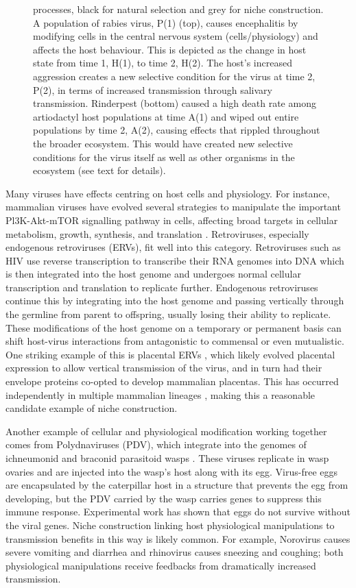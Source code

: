 \documentclass[review,draft,12pt]{elsarticle}
\begin{document}
\begin{figure}[htbp]
{processes, black for natural selection and grey for niche construction.
A population of rabies virus, P(1) (top), causes encephalitis by
modifying cells in the central nervous system (cells/physiology) and
affects the host behaviour. This is depicted as the change in host state
from time 1, H(1), to time 2, H(2). The host's increased aggression
creates a new selective condition for the virus at time 2, P(2), in
terms of increased transmission through salivary transmission.
Rinderpest (bottom) caused a high death rate among artiodactyl host
populations at time A(1) and wiped out entire populations by time 2,
A(2), causing effects that rippled throughout the broader ecosystem.
This would have created new selective conditions for the virus itself as
well as other organisms in the ecosystem (see text for details).}
\end{figure}

Many viruses have effects centring on host cells and physiology. For
instance, mammalian viruses have evolved several strategies to
manipulate the important Pl3K-Akt-mTOR signalling pathway in cells,
affecting broad targets in cellular metabolism, growth, synthesis, and
translation \citep{Buchkovich2008}. Retroviruses, especially endogenous
retroviruses (ERVs), fit well into this category. Retroviruses such as
HIV use reverse transcription to transcribe their RNA genomes into DNA
which is then integrated into the host genome and undergoes normal
cellular transcription and translation to replicate further. Endogenous
retroviruses continue this by integrating into the host genome and
passing vertically through the germline from parent to offspring,
usually losing their ability to replicate. These modifications of the
host genome on a temporary or permanent basis can shift host-virus
interactions from antagonistic to commensal or even mutualistic. One
striking example of this is placental ERVs \citep{Haig:2012qf}, which
likely evolved placental expression to allow vertical transmission of
the virus, and in turn had their envelope proteins co-opted to develop
mammalian placentas. This has occurred independently in multiple
mammalian lineages \citep{Lavialle:2013oc}, making this a reasonable
candidate example of niche construction.

Another example of cellular and physiological modification working
together comes from Polydnaviruses (PDV), which integrate into the
genomes of ichneumonid and braconid parasitoid wasps
\citep{Roossinck:2011iz}. These viruses replicate in wasp ovaries and
are injected into the wasp's host along with its egg. Virus-free eggs
are encapsulated by the caterpillar host in a structure that prevents
the egg from developing, but the PDV carried by the wasp carries genes
to suppress this immune response. Experimental work has shown that eggs
do not survive without the viral genes. Niche construction linking host
physiological manipulations to transmission benefits in this way is
likely common. For example, Norovirus causes severe vomiting and
diarrhea and rhinovirus causes sneezing and coughing; both physiological
manipulations receive feedbacks from dramatically increased
transmission.
\end{document}
